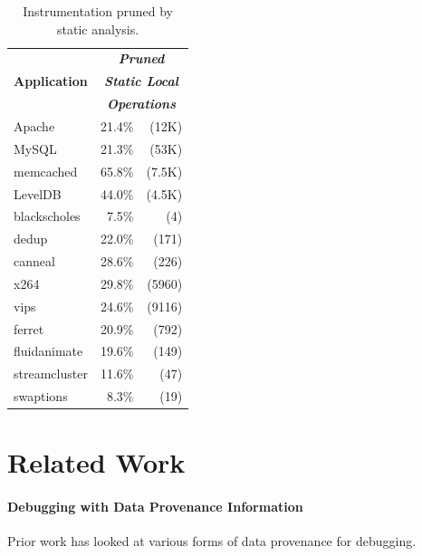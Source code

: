 \documentclass[preprint,9pt]{sigplanconf}
\begin{document}
\begin{table}[htb]
\centering
\small
\begin{tabular}{l | r r }
\multirow{3}{*}{\bf Application} & \multicolumn{2}{c}{\bf \em Pruned } \\
               & \multicolumn{2}{c}{\bf \em Static Local}  \\ 
               & \multicolumn{2}{c}{\bf \em Operations}    \\ \hline


Apache         &  21.4\%&(12K)                    \\
MySQL          &  21.3\%&(53K)                    \\
memcached      &  65.8\%&(7.5K)                   \\
LevelDB        &  44.0\%&(4.5K)                   \\ \hline
blackscholes   &   7.5\%&(4)                      \\
dedup          &   22.0\%&(171)                   \\
canneal        &   28.6\%&(226)                   \\
x264           &   29.8\%&(5960)                  \\
vips           &   24.6\%&(9116)                  \\
ferret         &   20.9\%&(792)                   \\
fluidanimate   &   19.6\%&(149)                   \\
streamcluster  &   11.6\%&(47)                    \\
swaptions      &   8.3\% &(19)                    \\
\end{tabular}
\caption{\label{tab:char}Instrumentation pruned by static analysis.}
\end{table}


\section{Related Work}

\paragraph{Debugging with Data Provenance Information}
Prior work has looked at various forms of data provenance for debugging.
\end{document}
